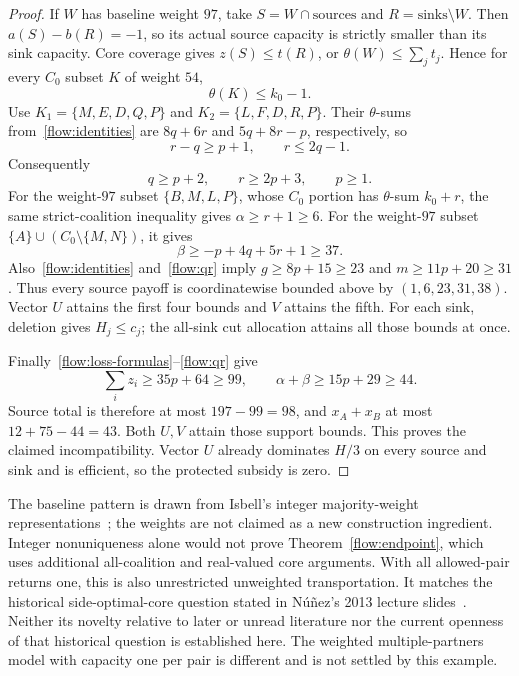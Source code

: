 \begin{proof}
If $W$ has baseline weight $97$, take $S=W\cap\mathrm{sources}$
and $R=\mathrm{sinks}\setminus W$. Then $a(S)-b(R)=-1$, so its
actual source capacity is strictly smaller than its sink capacity.
Core coverage gives $z(S)\le t(R)$, or
$\theta(W)\le\sum_jt_j$. Hence for every $C_0$ subset $K$ of
weight $54$,
\[
                         \theta(K)\le k_0-1.
\]
Use $K_1=\{M,E,D,Q,P\}$ and $K_2=\{L,F,D,R,P\}$.
Their $\theta$-sums from~\eqref{flow:identities} are $8q+6r$ and
$5q+8r-p$, respectively, so
\[
              r-q\ge p+1,\qquad r\le2q-1.
\]
Consequently
\begin{equation}\label{flow:qr}
                     q\ge p+2,\qquad r\ge2p+3,\qquad p\ge1.
\end{equation}
For the weight-$97$ subset $\{B,M,L,P\}$, whose $C_0$ portion has
$\theta$-sum $k_0+r$, the same strict-coalition inequality gives
$\alpha\ge r+1\ge6$. For the weight-$97$ subset
$\{A\}\cup(C_0\setminus\{M,N\})$, it gives
\[
                    \beta\ge -p+4q+5r+1\ge37.
\]
Also~\eqref{flow:identities} and~\eqref{flow:qr} imply
$g\ge8p+15\ge23$ and $m\ge11p+20\ge31$.
Thus every source payoff is coordinatewise bounded above by
$(1,6,23,31,38)$. Vector $U$ attains the first four bounds and $V$
attains the fifth. For each sink, deletion gives $H_j\le c_j$;
the all-sink cut allocation attains all those bounds at once.

Finally~\eqref{flow:loss-formulas}--\eqref{flow:qr} give
\[
             \sum_i z_i\ge35p+64\ge99,
              \qquad \alpha+\beta\ge15p+29\ge44.
\]
Source total is therefore at most $197-99=98$, and $x_A+x_B$ at
most $12+75-44=43$. Both $U,V$ attain those support bounds. This
proves the claimed incompatibility. Vector $U$ already dominates
$H/3$ on every source and sink and is efficient, so the protected
subsidy is zero.
\end{proof}

The baseline pattern is drawn from Isbell's integer majority-weight
representations~\cite[p.~27]{flow:Isbell1959}; the weights are not
claimed as a new construction ingredient. Integer nonuniqueness alone
would not prove Theorem~\ref{flow:endpoint}, which uses additional
all-coalition and real-valued core arguments. With all allowed-pair
returns one, this is also unrestricted unweighted transportation.
It matches the historical side-optimal-core question stated in
N\'u\~nez's 2013 lecture slides~\cite[pp.~37--40]{flow:Nunez2013}.
Neither its novelty relative to later or unread literature nor the
current openness of that historical question is established here.
The weighted multiple-partners model with capacity one per pair is
different and is not settled by this example.

